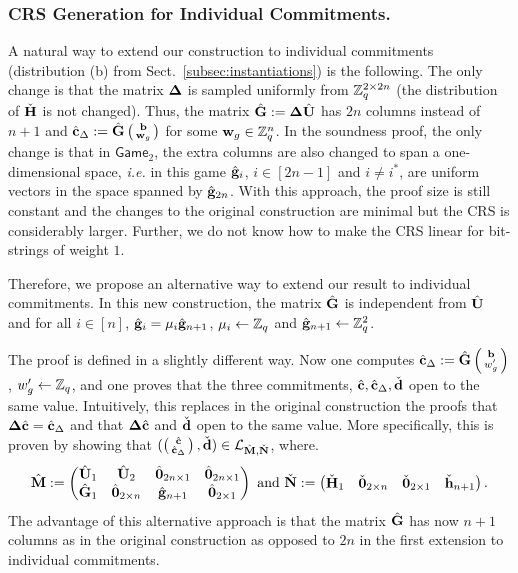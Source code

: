 \subsubsection{CRS Generation for Individual Commitments.}
A natural way to extend our construction to individual commitments (distribution (b) from Sect.\ \ref{subsec:instantiations}) is the following. The only change is that the matrix $\mathbf{{\Delta}}$ is sampled uniformly from  $\mathbb{Z}_q^{2 \times 2n}$ (the distribution of $\check{\mathbf{{H}}}$ is not changed). Thus, the matrix 
${\hat{\mathbf{{G}}}}:=\mathbf{{\Delta}} {\hat{\mathbf{{U}}}}$ has $2n$ columns instead of $n+1$ and 
${\hat{\mathbf{c}}}_{\Delta} := \hat{\mathbf{{G}}} \left(\begin{smallmatrix}\mathbf{b} \\ \mathbf{w}_g\end{smallmatrix}\right)$ for some $\mathbf{w}_g \in \mathbb{Z}_q^{n}$.   
In the soundness proof, the only change is that in $\mathsf{Game}_2$, the extra columns are also changed to span a one-dimensional space, \textit{i.e.} in this game $\hat{\mathbf{g}}_{i}$, $i \in [2n-1]$ and $i \neq i^*$, are uniform vectors in the space spanned by $\hat{\mathbf{g}}_{2n}$.
With this approach, the proof size is still constant and the changes to the original construction are minimal but the CRS is considerably larger. Further, we do not know how to make the CRS linear for bit-strings of weight $1$. 

Therefore, we propose an alternative way to extend our result to individual commitments. In this new construction, the matrix $\hat{\mathbf{{G}}}$ is independent from ${\hat{\mathbf{{U}}}}$ and for all $i \in [n]$, $\hat{\mathbf{g}}_{i} = \mu_i \hat{\mathbf{g}}_{n+1}$, $\mu_i \gets \mathbb{Z}_q$ and   $\hat{\mathbf{g}}_{n+1}\gets\mathbb{Z}_q^2$. 

The proof is defined in a slightly different way. Now one computes ${\hat{\mathbf{c}}}_\Delta:=\hat{\mathbf{{G}}}\left(\begin{smallmatrix}\mathbf{b}\\w'_g\end{smallmatrix}\right)$, $w'_g\gets\mathbb{Z}_q$, and one proves that the three commitments, ${\hat{\mathbf{c}}},{\hat{\mathbf{c}}}_\Delta,\check{\mathbf{d}}$ open to the same value.  Intuitively, this replaces in the original construction the proofs that $\mathbf{{\Delta}}{\hat{\mathbf{c}}}={\hat{\mathbf{c}}}_\Delta$ and that $\mathbf{{\Delta}}{\hat{\mathbf{c}}}$ and $\check{\mathbf{d}}$ open to the same value. More specifically, this is proven by showing that $(\left(\begin{smallmatrix}{\hat{\mathbf{c}}}\\{\hat{\mathbf{c}}}_\Delta\end{smallmatrix}\right), \check{\mathbf{d}})\in\mathcal{L}_{{\hat{\mathbf{{M}}}},\check{\mathbf{{N}}}}$, where.
$$
{\hat{\mathbf{{M}}}} := 
\left(\begin{matrix}
    {\hat{\mathbf{{U}}}}_1 & {\hat{\mathbf{{U}}}}_2           & {\hat{\mathbf{{0}}}}_{2n\times 1} & {\hat{\mathbf{{0}}}}_{2n\times 1}\\
    \hat{\mathbf{{G}}}_1      & {\hat{\mathbf{{0}}}}_{2\times n} & \hat{\mathbf{g}}_{n+1}             & {\hat{\mathbf{{0}}}}_{2\times 1}\\
\end{matrix}\right)
\text{ and }
\check{\mathbf{{N}}} :=
\left(\begin{matrix}
    \check{\mathbf{{H}}}_1      & \check{\mathbf{{0}}}_{2\times n} & \check{\mathbf{{0}}}_{2\times 1}  & \check{\mathbf{h}}_{n+1}
\end{matrix}\right).
$$
The advantage of this alternative approach is that the matrix $\hat{\mathbf{{G}}}$ has now $n+1$ columns as in the original construction as opposed to $2n$ in the first extension to individual commitments.  


